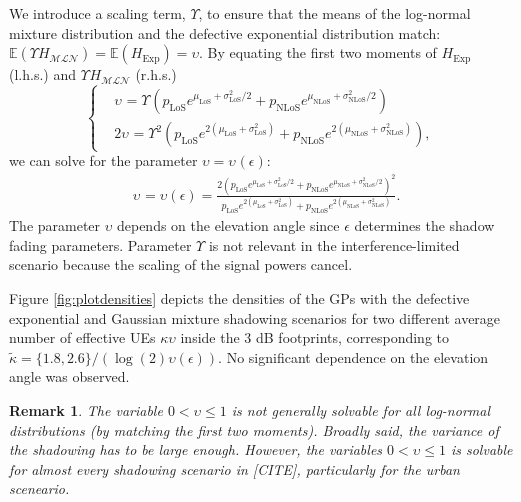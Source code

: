 \documentclass[lettersize,journal]{IEEEtran}
\newtheorem*{remark}{Remark}
\begin{document}
 We introduce a scaling term, $\Upsilon$, to ensure that the means of the log-normal mixture distribution and the defective exponential distribution match: $\mathbb{E}(\Upsilon H_{\mathcal{MLN}}) = \mathbb{E}(H_{\text{Exp}}) = \upsilon$. By equating the first two moments of $H_{\text{Exp}}$ (l.h.s.) and $\Upsilon_{} H_{\mathcal{M} \mathcal{L}\mathcal{N}}$ (r.h.s.)
\begin{equation}
  \label{eq:matchingmoments}
  \begin{cases}
    &\upsilon_{} = \Upsilon_{} \left(p_{\text{LoS}} e^{\mu_{\text{LoS}} + \sigma_{\text{LoS}}^2/2} + p_{\text{NLoS}} e^{\mu_{\text{NLoS}} + \sigma_{\text{NLoS}}^2/2}\right)\\
    &2\upsilon_{}= \Upsilon_{}^2 \left( p_{\text{LoS}} e^{2(\mu_{\text{LoS}} + \sigma_{\text{LoS}}^2)} + p_{\text{NLoS}} e^{2(\mu_{\text{NLoS}} + \sigma_{\text{NLoS}}^2)} \right), 
  \end{cases}
\end{equation}
 we can solve for the parameter $\upsilon= \upsilon_{}(\epsilon)$:
\begin{align}
  \label{eq:upsilon}
  & \upsilon_{}=\upsilon(\epsilon) =\frac{ 2\left( p_{\text{LoS}}e^{\mu_{\text{LoS}}+\sigma^2_{\text{LoS}}/2}+p_{\text{NLoS}}e^{\mu_{\text{NLoS}}+\sigma^2_{\text{NLoS}}/2} \right)^2}{p_{\text{LoS}}e^{2(\mu_{\text{LoS}}+\sigma_{\text{LoS}}^2)}+p_{\text{NLoS}}e^{2(\mu_{\text{NLoS}}+\sigma_{\text{NLoS}}^2)}}.
\end{align}
The parameter $\upsilon$ depends on the elevation angle since $\epsilon$ determines the shadow fading parameters. Parameter $\Upsilon$ is not relevant in the interference-limited scenario because the scaling of the signal powers cancel.


Figure \ref{fig:plotdensities} depicts the densities of the GPs with the defective exponential and Gaussian mixture shadowing scenarios for two different average number of effective UEs $\kappa \upsilon $ inside the $3$ dB footprints, corresponding to $\tilde{\kappa}=  \{1.8,2.6\}/(\log(2)\upsilon(\epsilon))$. No significant dependence on the elevation angle was observed.

\begin{remark}
  The variable $0 < \upsilon \leq 1$ is not generally solvable for all log-normal distributions (by matching the first two moments). Broadly said, the variance of the shadowing has to be large enough. However, the variables $0<\upsilon \leq 1$ is solvable for almost every shadowing scenario in [CITE], particularly for the urban sceneario.
\end{remark}
\end{document}
